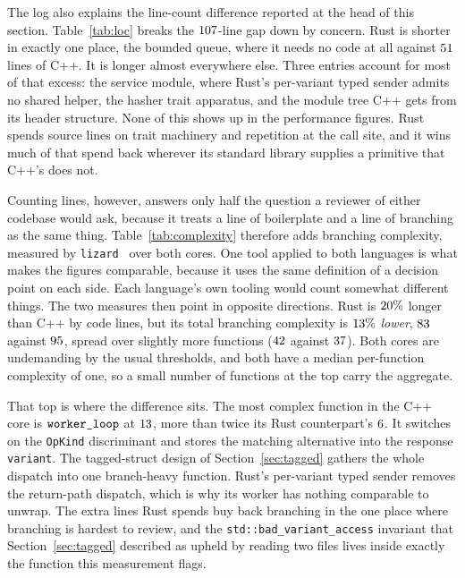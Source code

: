 \documentclass[english,oneside,a4paper,censored,csm,software-track-2020]{HYthesisML}
\begin{document}
The log also explains the line-count difference reported at the head of this section.
Table~\ref{tab:loc} breaks the $107$-line gap down by concern. Rust is shorter in exactly one
place, the bounded queue, where it needs no code at all against $51$ lines of
C++. It is longer almost everywhere else. Three entries account for most of that excess: the
service module, where Rust's per-variant typed sender admits no shared helper, the hasher trait
apparatus, and the module tree C++ gets from its header structure. None of this shows up in the
performance figures. Rust spends source lines on trait machinery and repetition at the call
site, and it wins much of that spend back wherever its standard library supplies a primitive that
C++'s does not.

Counting lines, however, answers only half the question a reviewer of either codebase would
ask, because it treats a line of boilerplate and a line of branching as the same thing.
Table~\ref{tab:complexity} therefore adds branching complexity, measured by
\texttt{lizard}~\cite{lizard} over both cores. One tool applied to both languages is what makes
the figures comparable, because it uses the same definition of a decision point on each side.
Each language's own tooling would count somewhat different things. The two measures then
point in opposite directions. Rust is $20\%$ longer than C++ by code lines, but its
total branching complexity is $13\%$ \emph{lower}, $83$ against
$95$, spread over slightly more functions ($42$ against $37$). Both
cores are undemanding by the usual thresholds, and both have a median per-function complexity
of one, so a small number of functions at the top carry the aggregate.

That top is where the difference sits. The most complex function in the C++ core is
$\texttt{worker\_loop}$ at $13$, more than twice its Rust counterpart's $6$. It
switches on the \texttt{OpKind} discriminant and stores the matching alternative into the
response \texttt{variant}. The tagged-struct design of Section~\ref{sec:tagged} gathers the
whole dispatch into one branch-heavy function. Rust's per-variant typed sender removes the
return-path dispatch, which is why its worker has nothing comparable to unwrap. The extra lines
Rust spends buy back branching in the one place where branching is hardest to review, and the
\texttt{std::bad\_variant\_access} invariant that Section~\ref{sec:tagged} described as upheld
by reading two files lives inside exactly the function this measurement flags.
\end{document}

